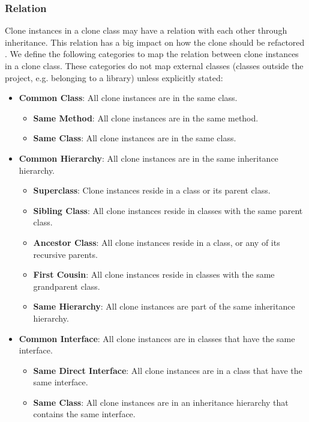 \documentclass[sigconf,review, table]{acmart}
\begin{document}
\subsubsection{Relation}\label{sec:relation}
Clone instances in a clone class may have a relation with each other through inheritance. This relation has a big impact on how the clone should be refactored \cite{fontana2015duplicated}. We define the following categories to map the relation between clone instances in a clone class. These categories do not map external classes (classes outside the project, e.g. belonging to a library) unless explicitly stated:
\begin{itemize}
    \item \textbf{Common Class}: All clone instances are in the same class.
    \begin{itemize}
        \item \textbf{Same Method}: All clone instances are in the same method.
        \item \textbf{Same Class}: All clone instances are in the same class.
    \end{itemize}
    \item \textbf{Common Hierarchy}: All clone instances are in the same inheritance hierarchy.
    \begin{itemize}
        \item \textbf{Superclass}: Clone instances reside in a class or its parent class.
        \item \textbf{Sibling Class}: All clone instances reside in classes with the same parent class.
        \item \textbf{Ancestor Class}: All clone instances reside in a class, or any of its recursive parents.
        \item \textbf{First Cousin}: All clone instances reside in classes with the same grandparent class.
        \item \textbf{Same Hierarchy}: All clone instances are part of the same inheritance hierarchy.
    \end{itemize}
    \item \textbf{Common Interface}: All clone instances are in classes that have the same interface.
    \begin{itemize}
        \item \textbf{Same Direct Interface}: All clone instances are in a class that have the same interface.
        \item \textbf{Same Class}: All clone instances are in an inheritance hierarchy that contains the same interface.

\end{itemize}
\end{itemize}
\end{document}
